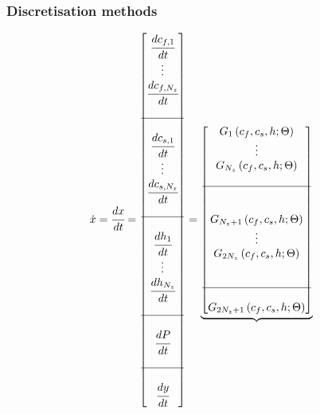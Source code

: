 \documentclass[a4paper,fleqn]{cas-dc}
\begin{document}
		\subsubsection{Discretisation methods}
		
		\begin{figure}[!h]
			\centering
			{\footnotesize
				\begin{align*}
					\dot{x} &= \cfrac{d x}{d t} = 
					\begin{bmatrix}
						\cfrac{d c_{f,1}}{d t} 	  \\
						\vdots					  \\
						\cfrac{d c_{f,N_z}}{d t} \\
						\\ \hline \\
						\cfrac{d c_{s,1}}{d t} 	  \\
						\vdots					  \\
						\cfrac{d c_{s,N_z}}{d t} \\
						\\ \hline \\
						\cfrac{d h_1}{d t} 	  \\
						\vdots 					  \\
						\cfrac{d h_{N_z}}{d t} \\
						\\ \hline \\
						\cfrac{d P}{d t} \\
						\\ \hline \\
						\cfrac{d y}{d t}
					\end{bmatrix}
					=
					\underbrace{\begin{bmatrix}
							G_1 \left( c_f,c_s,h; \Theta \right)\\ 
							\vdots\\ 
							G_{N_z} \left( c_f,c_s,h; \Theta \right)\\ 
							\\ \hline \\ \\
							G_{N_z+1} \left( c_f,c_s,h; \Theta \right)\\ 
							\vdots\\
							G_{2N_z} \left( c_f,c_s,h; \Theta \right)\\ 
							\\ \\ \hline \\ 
							G_{2N_z+1} \left( c_f,c_s,h; \Theta \right) \\

\end{bmatrix}}
\end{align*}}
\end{figure}
\end{document}
